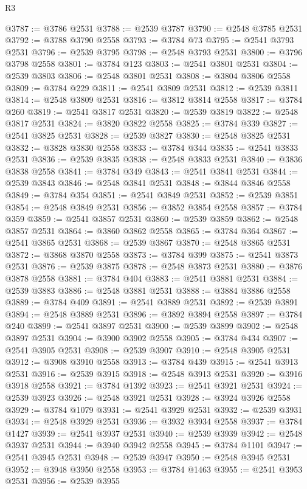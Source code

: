 \begin{lexlean}{R3}
\begin{coremodule}
@3787 := @3786 @2531
@3788 := @2539 @3787
@3790 := @2548 @3785 @2531
@3792 := @3788 @3790 @2558
@3793 := @3784 @73
@3795 := @2541 @3793 @2531
@3796 := @2539 @3795
@3798 := @2548 @3793 @2531
@3800 := @3796 @3798 @2558
@3801 := @3784 @123
@3803 := @2541 @3801 @2531
@3804 := @2539 @3803
@3806 := @2548 @3801 @2531
@3808 := @3804 @3806 @2558
@3809 := @3784 @229
@3811 := @2541 @3809 @2531
@3812 := @2539 @3811
@3814 := @2548 @3809 @2531
@3816 := @3812 @3814 @2558
@3817 := @3784 @260
@3819 := @2541 @3817 @2531
@3820 := @2539 @3819
@3822 := @2548 @3817 @2531
@3824 := @3820 @3822 @2558
@3825 := @3784 @339
@3827 := @2541 @3825 @2531
@3828 := @2539 @3827
@3830 := @2548 @3825 @2531
@3832 := @3828 @3830 @2558
@3833 := @3784 @344
@3835 := @2541 @3833 @2531
@3836 := @2539 @3835
@3838 := @2548 @3833 @2531
@3840 := @3836 @3838 @2558
@3841 := @3784 @349
@3843 := @2541 @3841 @2531
@3844 := @2539 @3843
@3846 := @2548 @3841 @2531
@3848 := @3844 @3846 @2558
@3849 := @3784 @354
@3851 := @2541 @3849 @2531
@3852 := @2539 @3851
@3854 := @2548 @3849 @2531
@3856 := @3852 @3854 @2558
@3857 := @3784 @359
@3859 := @2541 @3857 @2531
@3860 := @2539 @3859
@3862 := @2548 @3857 @2531
@3864 := @3860 @3862 @2558
@3865 := @3784 @364
@3867 := @2541 @3865 @2531
@3868 := @2539 @3867
@3870 := @2548 @3865 @2531
@3872 := @3868 @3870 @2558
@3873 := @3784 @399
@3875 := @2541 @3873 @2531
@3876 := @2539 @3875
@3878 := @2548 @3873 @2531
@3880 := @3876 @3878 @2558
@3881 := @3784 @404
@3883 := @2541 @3881 @2531
@3884 := @2539 @3883
@3886 := @2548 @3881 @2531
@3888 := @3884 @3886 @2558
@3889 := @3784 @409
@3891 := @2541 @3889 @2531
@3892 := @2539 @3891
@3894 := @2548 @3889 @2531
@3896 := @3892 @3894 @2558
@3897 := @3784 @240
@3899 := @2541 @3897 @2531
@3900 := @2539 @3899
@3902 := @2548 @3897 @2531
@3904 := @3900 @3902 @2558
@3905 := @3784 @434
@3907 := @2541 @3905 @2531
@3908 := @2539 @3907
@3910 := @2548 @3905 @2531
@3912 := @3908 @3910 @2558
@3913 := @3784 @439
@3915 := @2541 @3913 @2531
@3916 := @2539 @3915
@3918 := @2548 @3913 @2531
@3920 := @3916 @3918 @2558
@3921 := @3784 @1392
@3923 := @2541 @3921 @2531
@3924 := @2539 @3923
@3926 := @2548 @3921 @2531
@3928 := @3924 @3926 @2558
@3929 := @3784 @1079
@3931 := @2541 @3929 @2531
@3932 := @2539 @3931
@3934 := @2548 @3929 @2531
@3936 := @3932 @3934 @2558
@3937 := @3784 @1427
@3939 := @2541 @3937 @2531
@3940 := @2539 @3939
@3942 := @2548 @3937 @2531
@3944 := @3940 @3942 @2558
@3945 := @3784 @1101
@3947 := @2541 @3945 @2531
@3948 := @2539 @3947
@3950 := @2548 @3945 @2531
@3952 := @3948 @3950 @2558
@3953 := @3784 @1463
@3955 := @2541 @3953 @2531
@3956 := @2539 @3955

\end{coremodule}
\end{lexlean}
